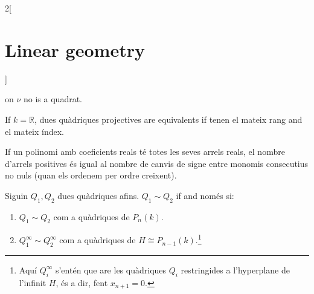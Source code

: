 \documentclass[class=article,10pt,crop=false]{standalone}
\begin{document}
\begin{multicols}{2}[\section{Linear geometry}]
\begin{theorem}
\begin{itemize}
on $\nu$ no is a quadrat.
\end{itemize}
\end{theorem}
\begin{theorem}
If $k=\mathbb{R}$, dues quàdriques projectives are equivalents if tenen el mateix rang and el mateix índex.
\end{theorem}
\begin{theorem}
If un polinomi amb coeficients reals té totes les seves arrels reals, el nombre d’arrels positives és igual al nombre de canvis de signe entre monomis consecutius no nuls (quan els ordenem per ordre creixent).
\end{theorem}
\begin{theorem}
Siguin $Q_1,Q_2$ dues quàdriques afins. $Q_1\sim Q_2$ if and només si:
\begin{enumerate}
    \item $Q_1\sim Q_2$ com a quàdriques de $P_n(k)$.
    \item $Q_1^\infty\sim Q_2^\infty$ com a quàdriques de $H\cong P_{n-1}(k)$.\footnote{Aquí $Q_i^\infty$ s'entén que are les quàdriques $Q_i$ restringides a l'hyperplane de l'infinit $H$, és a dir, fent $x_{n+1}=0$.}
\end{enumerate}
\end{theorem}
\end{multicols}
\end{document}
